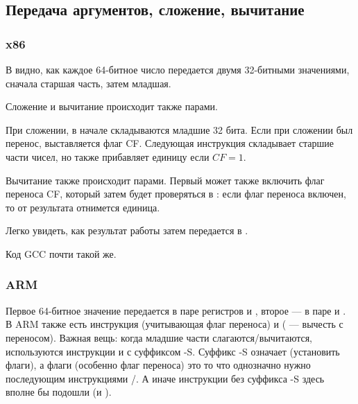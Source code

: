 ﻿\subsection{Передача аргументов, сложение, вычитание}



\subsubsection{x86}



В  видно, как каждое 64-битное число передается двумя 32-битными значениями,
сначала старшая часть, затем младшая.

Сложение и вычитание происходит также парами. 

При сложении, в начале складываются младшие 32 бита.
Если при сложении был перенос, выставляется флаг CF.
Следующая инструкция  складывает старшие части чисел, но также прибавляет единицу если $CF=1$.

Вычитание также происходит парами.
Первый \SUB может также включить флаг переноса CF, который затем будет проверяться в :
если флаг переноса включен, то от результата отнимется единица.

Легко увидеть, как результат работы  затем передается в \printf{}.



Код GCC почти такой же.

\subsubsection{ARM}



Первое 64-битное значение передается в паре регистров  и , второе --- в паре  и .
В ARM также есть инструкция  (учитывающая флаг переноса) и  ( --- вычесть с переносом).
Важная вещь: когда младшие части слагаются/вычитаются, используются инструкции  и  с суффиксом -S.
Суффикс -S означает  (установить флаги), а флаги (особенно флаг переноса) это то что однозначно нужно последующим инструкциями /.
А иначе инструкции без суффикса -S здесь вполне бы подошли (\ADD и \SUB).


